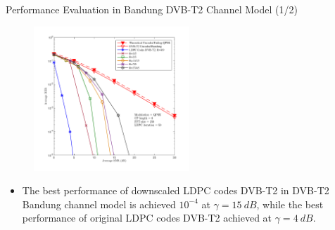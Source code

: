 \documentclass[11pt, aspectratio=169]{beamer}
\begin{document}
\begin{frame}{Performance Evaluation in Bandung DVB-T2 Channel Model (1/2)}
\begin{figure}
\begin{minipage}{.5\linewidth}
		\end{minipage}
		\hfill 	
		\hspace{ -1in}
		\begin{minipage}{.5\linewidth}
			\hspace{1cm}
			\includegraphics[width=2.3in]{hasilOFDMaslifix.pdf}
			
			\vspace{-0.5cm}
		\end{minipage}
		\hfill
		\label{gambar: ofdmhasil1}
	\end{figure}
	
	\begin{itemize}
	
\item \footnotesize
The best performance of downscaled LDPC codes DVB-T2 in DVB-T2 Bandung channel model is achieved $10^{-4}$ at $\gamma = 15~dB$, while the best performance of original LDPC codes DVB-T2 achieved at $\gamma = 4~dB$.


\end{itemize}
\end{frame}
\end{document}
